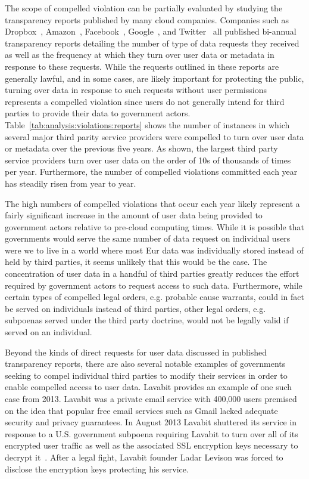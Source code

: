 The scope of compelled violation can be partially evaluated by
studying the transparency reports published by many cloud
companies. Companies such as Dropbox~\cite{dropbox-transparency},
Amazon~\cite{amazon-transparency},
Facebook~\cite{facebook-transparency},
Google~\cite{google-transparency}, and
Twitter~\cite{twitter-transparency} all published bi-annual
transparency reports detailing the number of type of data requests
they received as well as the frequency at which they turn over user
data or metadata in response to these requests. While the requests
outlined in these reports are generally lawful, and in some cases, are
likely important for protecting the public, turning over data in
response to such requests without user permissions represents a
compelled violation since users do not generally intend for third
parties to provide their data to government
actors. Table~\ref{tab:analysis:violations:reports} shows the number
of instances in which several major third parity service providers
were compelled to turn over user data or metadata over the previous
five years. As shown, the largest third party service providers turn
over user data on the order of 10s of thousands of times per
year. Furthermore, the number of compelled violations committed each
year has steadily risen from year to year.

The high numbers of compelled violations that occur each year likely
represent a fairly significant increase in the amount of user data
being provided to government actors relative to pre-cloud computing
times. While it is possible that governments would serve the same
number of data request on individual users were we to live in a world
where most Eur data was individually stored instead of held by third
parties, it seems unlikely that this would be the case. The
concentration of user data in a handful of third parties greatly
reduces the effort required by government actors to request access to
such data. Furthermore, while certain types of compelled legal orders,
e.g. probable cause warrants, could in fact be served on individuals
instead of third parties, other legal orders, e.g.  subpoenas served
under the third party doctrine, would not be legally valid if served
on an individual.

Beyond the kinds of direct requests for user data discussed in
published transparency reports, there are also several notable
examples of governments seeking to compel individual third parties to
modify their services in order to enable compelled access to user
data. Lavabit provides an example of one such case from 2013. Lavabit
was a private email service with 400,000 users premised on the idea
that popular free email services such as Gmail lacked adequate
security and privacy guarantees. In August 2013 Lavabit shuttered its
service in response to a U.S. government subpoena requiring Lavabit to
turn over all of its encrypted user traffic as well as the associated
SSL encryption keys necessary to decrypt it~\cite{lavabit,
  levsion-lavabit}. After a legal fight, Lavabit founder Ladar Levison
was forced to disclose the encryption keys protecting his service.

